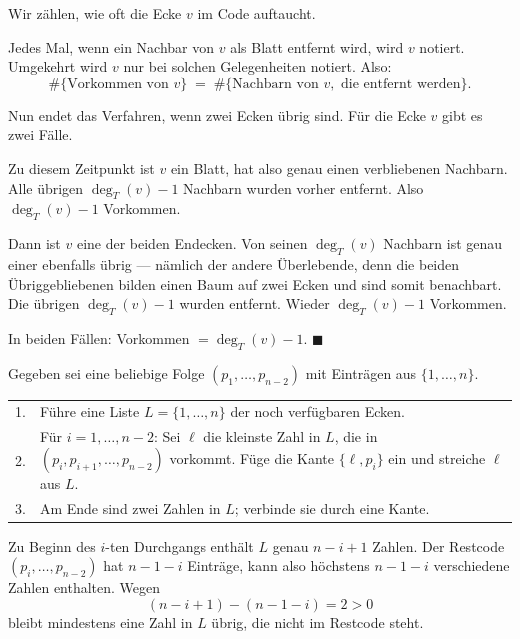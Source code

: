 \begin{merksatz}
Wir zählen, wie oft die Ecke $v$ im Code auftaucht.

Jedes Mal, wenn ein Nachbar von $v$ als Blatt entfernt wird, wird $v$ notiert. Umgekehrt wird $v$ nur bei solchen Gelegenheiten notiert. Also:
\[ \#\{\text{Vorkommen von } v\} \;=\; \#\{\text{Nachbarn von } v, \text{ die entfernt werden}\} . \]

Nun endet das Verfahren, wenn zwei Ecken übrig sind. Für die Ecke $v$ gibt es zwei Fälle.

 Zu diesem Zeitpunkt ist $v$ ein Blatt, hat also genau einen verbliebenen Nachbarn. Alle übrigen $\deg_T(v) - 1$ Nachbarn wurden vorher entfernt. Also $\deg_T(v) - 1$ Vorkommen.

 Dann ist $v$ eine der beiden Endecken. Von seinen $\deg_T(v)$ Nachbarn ist genau einer ebenfalls übrig --- nämlich der andere Überlebende, denn die beiden Übriggebliebenen bilden einen Baum auf zwei Ecken und sind somit benachbart. Die übrigen $\deg_T(v) - 1$ wurden entfernt. Wieder $\deg_T(v) - 1$ Vorkommen.

In beiden Fällen: Vorkommen $= \deg_T(v) - 1$. $\blacksquare$

\begin{center}
\begin{minipage}{0.88\textwidth}
\end{minipage}
\end{center}
\end{merksatz}

\begin{merksatz}
Gegeben sei eine beliebige Folge $(p_1, \ldots, p_{n-2})$ mit Einträgen aus $\{1,\ldots,n\}$.

\begin{center}
\renewcommand{\arraystretch}{1.55}
\begin{tabular}{@{}P{1.2cm}P{7.2cm}@{}}
. & Führe eine Liste $L = \{1,\ldots,n\}$ der noch verfügbaren Ecken.\\
2. & Für $i = 1, \ldots, n-2$: Sei $\ell$ die kleinste Zahl in $L$, die in $(p_i, p_{i+1}, \ldots, p_{n-2})$  vorkommt. Füge die Kante $\{\ell, p_i\}$ ein und streiche $\ell$ aus $L$.\\
3. & Am Ende sind zwei Zahlen in $L$; verbinde sie durch eine Kante.\\
\bottomrule
\end{tabular}
\end{center}

Zu Beginn des $i$-ten Durchgangs enthält $L$ genau $n - i + 1$ Zahlen. Der Restcode $(p_i, \ldots, p_{n-2})$ hat $n-1-i$ Einträge, kann also höchstens $n-1-i$ verschiedene Zahlen enthalten. Wegen
\[ (n-i+1) - (n-1-i) = 2 > 0 \]
bleibt mindestens eine Zahl in $L$ übrig, die nicht im Restcode steht.
\end{merksatz}

